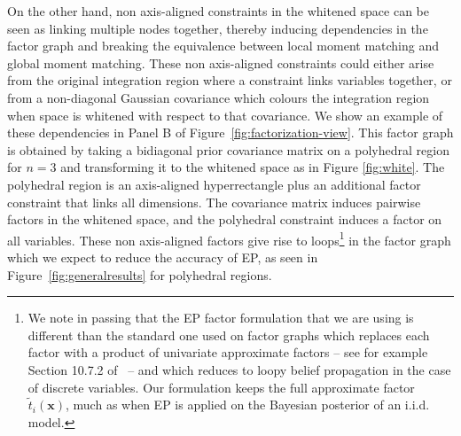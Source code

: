 \documentclass[twoside,11pt]{article}
\def\x{{\mathbf x}}
\begin{document}
On the other hand, non axis-aligned constraints in the whitened space can be seen as linking multiple nodes together, thereby inducing dependencies in the factor graph and breaking the equivalence between local moment matching and global moment matching. These non axis-aligned constraints could either arise from the original integration region where a constraint links variables together, or from a non-diagonal Gaussian covariance which colours the integration region when space is whitened with respect to that covariance.  We show an example of these dependencies in Panel B of Figure~\ref{fig:factorization-view}. This factor graph is obtained by taking a bidiagonal prior covariance matrix on a polyhedral region for $n=3$ and transforming it to the whitened space as in Figure \ref{fig:white}. The polyhedral region is an axis-aligned hyperrectangle plus an additional factor constraint that links all dimensions.  The covariance matrix induces pairwise factors in the whitened space, and the polyhedral constraint induces a factor on all variables. These non axis-aligned factors give rise to loops\footnote{We note in passing that the EP factor formulation that we are using is different than the standard one used on factor graphs which replaces each factor with a product of univariate approximate factors -- see for example Section 10.7.2 of~\cite{bishopBook} -- and which reduces to loopy belief propagation in the case of discrete variables. Our formulation keeps the full approximate factor $\tilde{t}_i(\x)$, much as when EP is applied on the Bayesian posterior of an i.i.d. model.} in the factor graph which we expect to reduce the accuracy of EP, as seen in Figure~\ref{fig:generalresults} for polyhedral regions.
\end{document}
